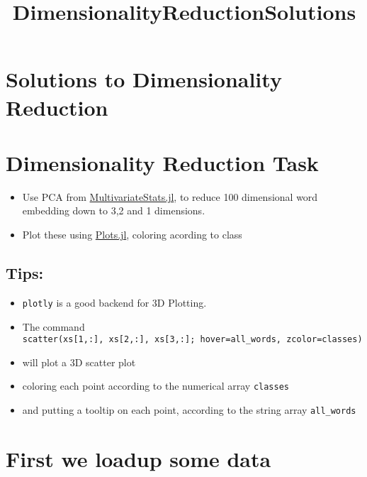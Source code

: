 \documentclass[11pt]{article}
\title{DimensionalityReductionSolutions}
\providecommand{\tightlist}{%
      \setlength{\itemsep}{0pt}\setlength{\parskip}{0pt}}
\begin{document}
    
    
    \maketitle
    
    

    
    \section{Solutions to Dimensionality
Reduction}\label{solutions-to-dimensionality-reduction}

\section{Dimensionality Reduction
Task}\label{dimensionality-reduction-task}

\begin{itemize}
\tightlist
\item
  Use PCA from
  \href{https://github.com/JuliaStats/MultivariateStats.jl}{MultivariateStats.jl},
  to reduce 100 dimensional word embedding down to 3,2 and 1 dimensions.
\item
  Plot these using
  \href{https://github.com/tbreloff/Plots.jl}{Plots.jl}, coloring
  acording to class
\end{itemize}

\subsection{Tips:}\label{tips}

\begin{itemize}
\tightlist
\item
  \texttt{plotly} is a good backend for 3D Plotting.
\item
  The command
  \texttt{scatter(xs{[}1,:{]},\ xs{[}2,:{]},\ xs{[}3,:{]};\ hover=all\_words,\ zcolor=classes)}
\item
  will plot a 3D scatter plot
\item
  coloring each point according to the numerical array \texttt{classes}
\item
  and putting a tooltip on each point, according to the string array
  \texttt{all\_words}
\end{itemize}

    \section{First we loadup some data}\label{first-we-loadup-some-data}
\end{document}
